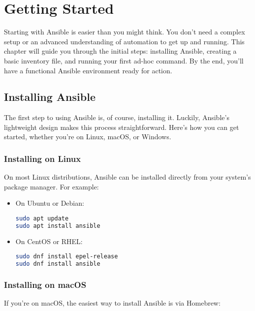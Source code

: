 \chapter{Getting Started}
\sloppy

Starting with Ansible is easier than you might think. You don't need a complex setup or an advanced understanding of automation to get up and running. This chapter will guide you through the initial steps: installing Ansible, creating a basic inventory file, and running your first ad-hoc command. By the end, you'll have a functional Ansible environment ready for action.

\section{Installing Ansible}

The first step to using Ansible is, of course, installing it. Luckily, Ansible's lightweight design makes this process straightforward. Here's how you can get started, whether you're on Linux, macOS, or Windows.

\subsection{Installing on Linux}

On most Linux distributions, Ansible can be installed directly from your system's package manager. For example:

\begin{itemize}
    \item On Ubuntu or Debian:
    \begin{lstlisting}[language=bash, caption=Install Ansible on Ubuntu/Debian]
sudo apt update
sudo apt install ansible
    \end{lstlisting}

    \item On CentOS or RHEL:
    \begin{lstlisting}[language=bash, caption=Install Ansible on CentOS/RHEL]
sudo dnf install epel-release
sudo dnf install ansible
    \end{lstlisting}
\end{itemize}

\subsection{Installing on macOS}

If you're on macOS, the easiest way to install Ansible is via Homebrew:

